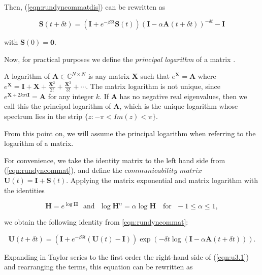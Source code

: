 Then, (\ref{eqn:rundyncommatdis}) can be rewritten as
 
 \begin{equation}
\label{eqn:rundyncommat}
    \mathbf{S}(t + \delta t) = \left(\mathbf{I} + e^{-\beta\delta t}\mathbf{S}(t)\right) (\mathbf{I} - \alpha\mathbf{A}(t+\delta t))^{-\delta t} - \mathbf{I}
\end{equation} 

with $\mathbf{S}(0)=\mathbf{0}$.

Now, for practical purposes we define the \textit{principal logarithm} of a matrix \cite[Ch.\ 11]{higham2008functions}.
\begin{definition}
    A logarithm of $\mathbf{A} \in \mathbb{C}^{N\times N}$ is any matrix $\mathbf{X}$ such that $e^{\mathbf{X}} = \mathbf{A}$ where $e^{\mathbf{X}} = \mathbf{I} + \mathbf{X} + \frac{\mathbf{X}^2}{2!} + \frac{\mathbf{X}^3}{3!} + \cdots$. The matrix logarithm is not unique, since $e^{\mathbf{X}+2k\pi i\mathbf{I}} = \mathbf{A}$ for any integer $k$. If $\mathbf{A}$ has no negative real eigenvalues, then we call this the principal logarithm of $\mathbf{A}$, which is the unique logarithm whose spectrum lies in the strip $\{ z : −\pi < Im(z) < \pi \}$.
\end{definition}
From this point on, we will assume the principal logarithm when referring to the logarithm of a matrix. 

For convenience, we take the identity matrix to the left hand side from (\ref{eqn:rundyncommat}), and define the $\textit{communicability matrix~}$ $\mathbf{U}(t)=\mathbf{I} + \mathbf{S}(t)$. Applying the matrix exponential and matrix logarithm with the identities \cite[Ch.\ 11]{higham2008functions}

$$\mathbf{H} =e^{\log \mathbf{H}} \text{~~and~~} \log \mathbf{H}^\alpha =\alpha\log \mathbf{H} \text{~~~for~~} -1 \le \alpha \le 1,$$ 

we obtain the following identity from \eqref{eqn:rundyncommat}:

\begin{equation}
\label{eqn:u3.1}
    \mathbf{U}(t + \delta t) = \left(\mathbf{I} + e^{-\beta\delta t}(\mathbf{U}(t) - \mathbf{I})\right) \exp\left(-\delta t \log (\mathbf{I} - \alpha \mathbf{A}(t + \delta t)) \right).
\end{equation} 

Expanding in Taylor series to the first order the right-hand
side of (\ref{eqn:u3.1}) and rearranging the terms, this equation can be rewritten as

